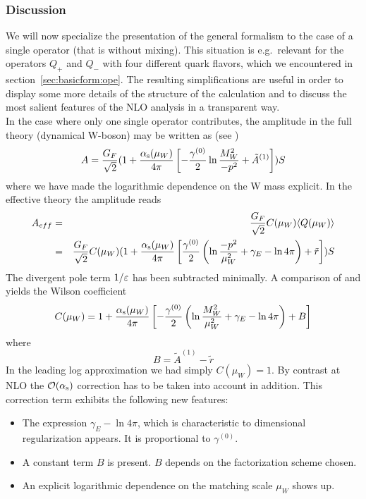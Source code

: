\subsubsection{Discussion}
               \label{sec:basicform:wc:disc}
We will now specialize the presentation of the general formalism to the
case of a single operator (that is without mixing).  This situation is
e.g.\ relevant for the operators $Q_+$ and $Q_-$ with four different quark
flavors, which we encountered in section~\ref{sec:basicform:ope}. The
resulting simplifications are useful in order to display some more
details of the structure of the calculation and to discuss the most
salient features of the NLO analysis in a transparent way.
\\
In the case where only one single operator contributes, the
amplitude in the full theory (dynamical W-boson) may be written as
(see )
\begin{equation}\label{amp2}
A={G_F\over\sqrt{2}}(1+{\alpha_{\rm s}(\mu_W)\over 4\pi}\left[-{\gamma^{(0)}\over 2}
\ln{M^2_W\over -p^2}+\tilde A^{(1)}\right]) S  \end{equation}
where we have made the logarithmic dependence on the W mass explicit.
In the effective theory the amplitude reads
\begin{eqnarray}\label{aef2}
A_{eff}&=&{G_F\over\sqrt{2}}C(\mu_W)\langle Q(\mu_W)\rangle \\
&=&{G_F\over\sqrt{2}}C(\mu_W)(1+{\alpha_{\rm s}(\mu_W)\over 4\pi}\left[{\gamma^{(0)}\over 2}
 \left(\ln{-p^2\over\mu^2_W}+\gamma_E-\ln 4\pi\right)+\tilde r
 \right])S   \nonumber
\end{eqnarray}
The divergent pole term $1/\varepsilon$ has been subtracted minimally. A
comparison of  and  yields the Wilson coefficient
\begin{equation}\label{cmw2}
 C(\mu_W)=1+{\alpha_{\rm s}(\mu_W)\over 4\pi}\left[-{\gamma^{(0)}\over 2}
 \left(\ln{M^2_W\over\mu^2_W}+\gamma_E-\ln 4\pi\right)+B\right] \end{equation}
where
\begin{equation}\label{ba1r} B=\tilde A^{(1)}-\tilde r  \end{equation}
In the leading log approximation we had simply $C(\mu_W)=1$. By
contrast at NLO the ${\cal O}(\alpha_{\rm s})$ correction has to be taken into
account in addition. This correction term exhibits the following
new features:
\begin{itemize}
\item The expression $\gamma_E-\ln 4\pi$, which is characteristic to
dimensional regularization appears. It is proportional to $\gamma^{(0)}$.
\item A constant term $B$ is present. $B$ depends on the
factorization scheme chosen.
\item An explicit logarithmic dependence on the matching scale
$\mu_W$ shows up.
\end{itemize}
